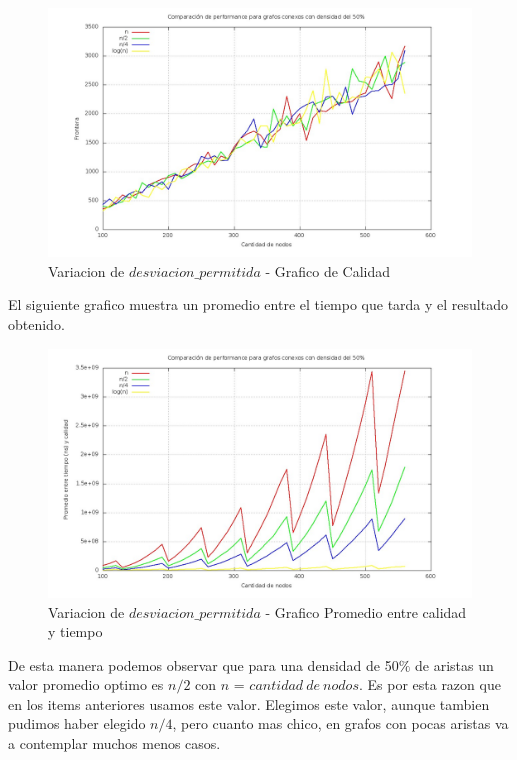 \begin{figure}[H] %
\begin{center}
\includegraphics[width=350pt]{../imgs/variacioncalidad_tabu.jpg}
\caption{Variacion de $desviacion\_permitida$ - Grafico de Calidad}
\end{center}
\end{figure}

El siguiente grafico muestra un promedio entre el tiempo que tarda y el resultado obtenido.

\begin{figure}[H] %
\begin{center}
\includegraphics[width=350pt]{../imgs/variacionpromedio_tabu.jpg}
\caption{Variacion de $desviacion\_permitida$ - Grafico Promedio entre calidad y tiempo}
\end{center}
\end{figure}

De esta manera podemos observar que para una densidad de 50$\%$ de aristas un valor promedio optimo es $n/2$ con $n$ = $cantidad\ de\ nodos$. Es por esta razon que en los items anteriores usamos este valor. Elegimos este valor, aunque tambien pudimos haber elegido $n/4$, pero cuanto mas chico, en grafos con pocas aristas va a contemplar muchos menos casos.

